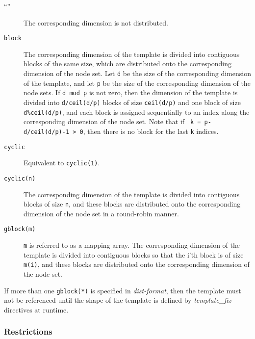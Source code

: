 \begin{description}
\item[``{\tt *}'']
	   The corresponding dimension is not distributed.

\item[{\tt block}]
	   The corresponding dimension of the template is divided into
	   contiguous blocks of the same size, which are distributed onto
	   the corresponding dimension of the node set. Let {\tt d} be
	   the size of the corresponding dimension of the template, and
	   let {\tt p} be the size of the corresponding dimension of the
	   node sets. If {\tt d mod p} is not zero, then the dimension
	   of the template is divided into {\tt d/ceil(d/p)} blocks of
	   size {\tt ceil(d/p)} and one block of size {\tt d\%ceil(d/p)},
	   and each block is assigned sequentially to an index along the
	   corresponding dimension of the node set. Note that if {\tt
	   k = p-d/ceil(d/p)-1 > 0}, then there is no block for the last
	   {\tt k} indices.

\item[{\tt cyclic}]
	   Equivalent to {\tt cyclic(1)}.

\item[{\tt cyclic(n)}]
	   The corresponding dimension of the template is divided into
	   contiguous blocks of size {\tt n}, and these blocks are
	   distributed onto the corresponding dimension of the node set
	   in a round-robin manner.

\item[{\tt gblock(m)}]
	   {\tt m} is referred to as a mapping array. The corresponding
	   dimension of the template is divided into contiguous
	   blocks so that the i'th block is of size {\tt m(i)}, and
	   these blocks are distributed onto the corresponding dimension
	   of the node set.
\end{description}

If more than one {\tt gblock(*)} is specified in {\it dist-format},
then the template must not be referenced until the shape of the template
is defined by {\it template\_fix} directives at runtime.


\subsubsection*{Restrictions}

